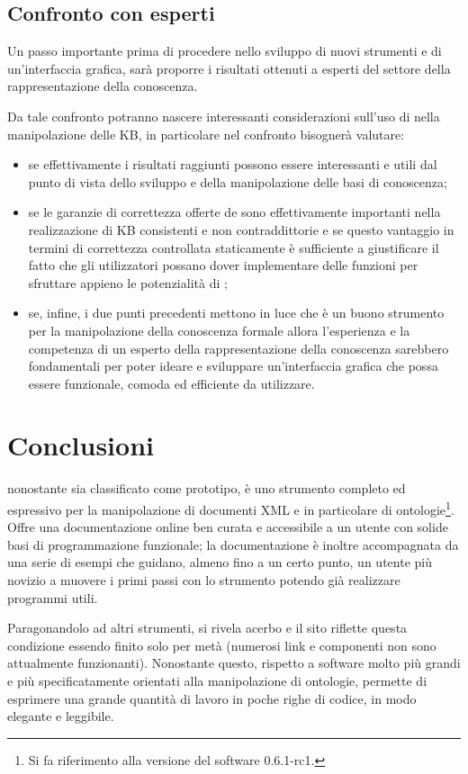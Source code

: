 \subsection{Confronto con esperti}
Un passo importante prima di procedere nello sviluppo di nuovi strumenti e di un'interfaccia grafica, sarà proporre i risultati ottenuti a esperti del settore della rappresentazione della conoscenza.

Da tale confronto potranno nascere interessanti considerazioni sull'uso di \cduce nella manipolazione delle KB, in particolare nel confronto bisognerà valutare:
\begin{itemize}
	\item se effettivamente i risultati raggiunti possono essere interessanti e utili dal punto di vista dello sviluppo e della manipolazione delle basi di conoscenza;
	\item se le garanzie di correttezza offerte de \cduce sono effettivamente importanti nella realizzazione di KB consistenti e non contraddittorie e se questo vantaggio in termini di correttezza controllata staticamente è sufficiente a giustificare il fatto che gli utilizzatori possano dover implementare delle funzioni per sfruttare appieno le potenzialità di \cduce;
	\item se, infine, i due punti precedenti mettono in luce che \cduce è un buono strumento per la manipolazione della conoscenza formale allora l'esperienza e la competenza di un esperto della rappresentazione della conoscenza sarebbero fondamentali per poter ideare e sviluppare un'interfaccia grafica che possa essere funzionale, comoda ed efficiente da utilizzare.
\end{itemize}
\section{Conclusioni}
\cduce nonostante sia classificato come prototipo, è uno strumento completo ed espressivo per la manipolazione di documenti XML e in particolare di ontologie\footnote{Si fa riferimento alla versione del software 0.6.1-rc1.}. Offre una documentazione online ben curata e accessibile a un utente con solide basi di programmazione funzionale; la documentazione è inoltre accompagnata da una serie di esempi che guidano, almeno fino a un certo punto, un utente più novizio a muovere i primi passi con lo strumento potendo già realizzare programmi utili.

Paragonandolo ad altri strumenti, si rivela acerbo e il sito riflette questa condizione essendo finito solo per metà (numerosi link e componenti non sono attualmente funzionanti). Nonostante questo, rispetto a software molto più grandi e più specificatamente orientati alla manipolazione di ontologie, \cduce permette di esprimere una grande quantità di lavoro in poche righe di codice, in modo elegante e leggibile. 

